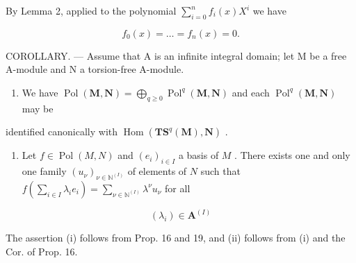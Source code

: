 By Lemma 2, applied to the polynomial \(\sum_{i=0}^{n} f_i(x) X^i\) we have

\[
f _ {0} (x) = \dots = f _ {n} (x) = 0.
\]

COROLLARY. --- Assume that A is an infinite integral domain; let M be a free A-module and N a torsion-free A-module.

\begin{enumerate}
\def\labelenumi{(\roman{enumi})}
\tightlist
\item
  We have \(\operatorname{Pol}(\mathbf{M},\mathbf{N}) = \bigoplus_{q\geqslant 0}\operatorname{Pol}^q (\mathbf{M},\mathbf{N})\) and each \(\operatorname{Pol}^q (\mathbf{M},\mathbf{N})\) may be
\end{enumerate}

identified canonically with \(\operatorname{Hom}(\mathbf{TS}^q(\mathbf{M}),\mathbf{N})\) .

\begin{enumerate}
\def\labelenumi{(\roman{enumi})}
\setcounter{enumi}{1}
\tightlist
\item
  Let \(f \in \operatorname{Pol}(M, N)\) and \((e_i)_{i \in I}\) a basis of \(M\) . There exists one and only one family \((u_\nu)_{\nu \in \mathbb{N}^{(I)}}\) of elements of \(N\) such that \(f\left(\sum_{i \in I} \lambda_i e_i\right) = \sum_{\nu \in \mathbb{N}^{(I)}} \lambda^\nu u_\nu\) for all
\end{enumerate}

\[
\left(\lambda_ {i}\right) \in \mathbf {A} ^ {(I)}
\]

The assertion (i) follows from Prop. 16 and 19, and (ii) follows from (i) and the Cor. of Prop. 16.

